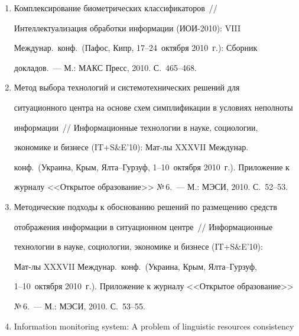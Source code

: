 \begin{enumerate}[1.]
Актуальные проблемы теоретической и прикладной лингвистики: Труды 


Междунар.\ науч.\ конф., посвященной памяти проф.\ 


Р.\,Г.~Пиотровского (Минск, Беларусь, 15--16~июня 2010~г.).~--- Минск: 


МГЛУ, 2010. С.~126--130.


\item {}


Комплексирование биометрических классификаторов~/\!\!/  


Интеллектуализация обработки информации (ИОИ-2010): VIII 


Междунар.\ конф.\ (Пафос, Кипр, 17--24~октября 2010~г.): Сборник 


докладов.~--- М.: МАКС Пресс, 2010. С.~465--468.


\item {}


Метод выбора технологий и сис\-темотехнических решений для 


ситуационного центра на основе схем симплификации в условиях неполноты 


информации~/\!\!/  Информационные технологии в науке, социологии, 


экономике и бизнесе (IT\;+\;S\&E'10): Мат-лы XXXVII Междунар.\ 


конф.\ (Украина, Крым, Ялта--Гурзуф, 1--10~октября 2010~г.). Приложение к 


журналу <<Открытое образование>> №\,6.~--- М.: МЭСИ, 2010. С.~52--53.


\item {}


Методические подходы к обоснованию решений по размещению средств 


отображения информации в ситуационном центре~/\!\!/  Информационные 


технологии в науке, социологии, экономике и бизнесе (IT\;+\;S\&E'10): 


Мат-лы XXXVII Междунар.\ конф.\ (Украина, Крым, Ялта--Гурзуф, 


1--10~октября 2010~г.). Приложение к журналу <<Открытое образование>> 


№\,6.~--- М.: МЭСИ, 2010. С.~53--55.


\item {}


Information monitoring system: A problem of linguistic resources consistency 



\end{enumerate}
